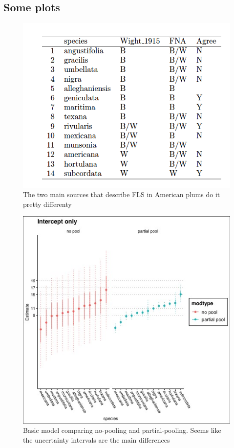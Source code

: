 \documentclass[12pt]{article}\usepackage[]{graphicx}\usepackage[]{color}
\begin{document}
\subsection{Some plots}
\begin{figure}[h!]
        \centering
         \includegraphics[width=\textwidth]{..//Plots/comparison_table.png}
                 \caption{The two main sources that describe FLS in American plums do it pretty differenty}
    \end{figure}  

\begin{figure}[h!]
        \centering
         \includegraphics[width=\textwidth]{..//Plots/poolingcomps.jpeg}
                 \caption{Basic model comparing no-pooling and partial-pooling. Seems like the uncertainty intervals are the main differences}
    \end{figure}  
    
\end{document}
